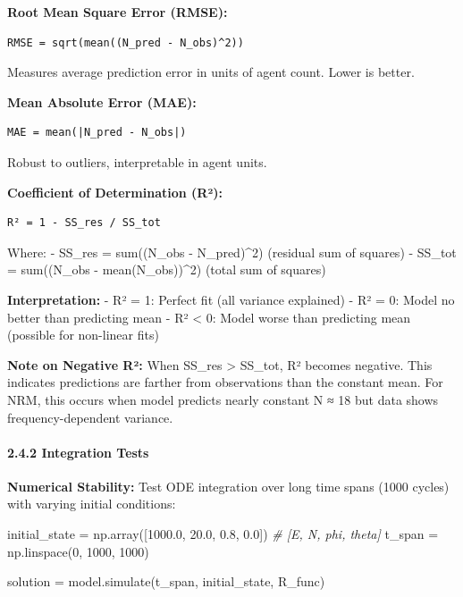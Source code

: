 \documentclass[
]{article}
\newenvironment{Shaded}{}{}
\newcommand{\CommentTok}[1]{\textcolor[rgb]{0.38,0.63,0.69}{\textit{#1}}}
\newcommand{\DecValTok}[1]{\textcolor[rgb]{0.25,0.63,0.44}{#1}}
\newcommand{\FloatTok}[1]{\textcolor[rgb]{0.25,0.63,0.44}{#1}}
\newcommand{\NormalTok}[1]{#1}
\newcommand{\OperatorTok}[1]{\textcolor[rgb]{0.40,0.40,0.40}{#1}}
\begin{document}
\textbf{Root Mean Square Error (RMSE):}

\begin{verbatim}
RMSE = sqrt(mean((N_pred - N_obs)^2))
\end{verbatim}

Measures average prediction error in units of agent count. Lower is
better.

\textbf{Mean Absolute Error (MAE):}

\begin{verbatim}
MAE = mean(|N_pred - N_obs|)
\end{verbatim}

Robust to outliers, interpretable in agent units.

\textbf{Coefficient of Determination (R²):}

\begin{verbatim}
R² = 1 - SS_res / SS_tot
\end{verbatim}

Where: - SS\_res = sum((N\_obs - N\_pred)\^{}2) (residual sum of
squares) - SS\_tot = sum((N\_obs - mean(N\_obs))\^{}2) (total sum of
squares)

\textbf{Interpretation:} - R² = 1: Perfect fit (all variance explained)
- R² = 0: Model no better than predicting mean - R² \textless{} 0: Model
worse than predicting mean (possible for non-linear fits)

\textbf{Note on Negative R²:} When SS\_res \textgreater{} SS\_tot, R²
becomes negative. This indicates predictions are farther from
observations than the constant mean. For NRM, this occurs when model
predicts nearly constant N ≈ 18 but data shows frequency-dependent
variance.

\paragraph{2.4.2 Integration Tests}\label{integration-tests}

\textbf{Numerical Stability:} Test ODE integration over long time spans
(1000 cycles) with varying initial conditions:

\begin{Shaded}
\begin{Highlighting}[]
\NormalTok{initial\_state }\OperatorTok{=}\NormalTok{ np.array([}\FloatTok{1000.0}\NormalTok{, }\FloatTok{20.0}\NormalTok{, }\FloatTok{0.8}\NormalTok{, }\FloatTok{0.0}\NormalTok{])  }\CommentTok{\# [E, N, phi, theta]}
\NormalTok{t\_span }\OperatorTok{=}\NormalTok{ np.linspace(}\DecValTok{0}\NormalTok{, }\DecValTok{1000}\NormalTok{, }\DecValTok{1000}\NormalTok{)}

\NormalTok{solution }\OperatorTok{=}\NormalTok{ model.simulate(t\_span, initial\_state, R\_func)}
\end{Highlighting}
\end{Shaded}
\end{document}
